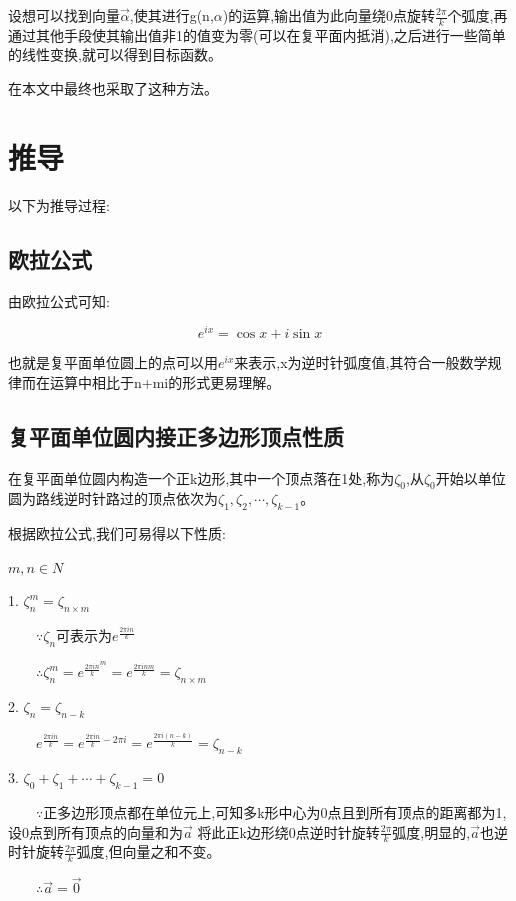 \documentclass[final,3p,times,onecolumn]{elsarticle}
\begin{document}
设想可以找到向量$\overrightarrow{\alpha}$,使其进行g(n,$\alpha$)的运算,输出值为此向量绕0点旋转$\frac{2\pi}{k}$个弧度,再通过其他手段使其输出值非1的值变为零(可以在复平面内抵消),之后进行一些简单的线性变换,就可以得到目标函数。

在本文中最终也采取了这种方法。

\section{推导}

以下为推导过程:

\subsection{欧拉公式}

由欧拉公式可知:

$$e^{ix}=\cos x+i\sin x$$

也就是复平面单位圆上的点可以用$e^{ix}$来表示,x为逆时针弧度值,其符合一般数学规律而在运算中相比于n+mi的形式更易理解。

\subsection{复平面单位圆内接正多边形顶点性质}

在复平面单位圆内构造一个正k边形,其中一个顶点落在1处,称为$\zeta_0$,从$\zeta_0$开始以单位圆为路线逆时针路过的顶点依次为$\zeta_1,\zeta_2,\cdots,\zeta_{k-1}$。

根据欧拉公式,我们可易得以下性质:

$m,n\in N$

1. $\zeta_n^m=\zeta_{n\times m}$

$\qquad\because\zeta_n$可表示为$e^{\frac{2\pi in}{k}}$

$\qquad\therefore\zeta_n^m=e^{\frac{2\pi in}{k}^m}=e^{\frac{2\pi inm}{k}}=\zeta_{n\times m}$

2. $\zeta_n=\zeta_{n-k}$

$\qquad e^{\frac{2\pi in}{k}}=e^{\frac{2\pi in}{k}-2\pi i}=e^{\frac{2\pi i(n-k)}{k}}=\zeta_{n-k}$

3. $\zeta_0+\zeta_1+\cdots+\zeta_{k-1}=0$

$\qquad\because$正多边形顶点都在单位元上,可知多k形中心为0点且到所有顶点的距离都为1,设0点到所有顶点的向量和为$\overrightarrow{a}$
将此正k边形绕0点逆时针旋转$\frac{2\pi}{k}$弧度,明显的,$\overrightarrow{a}$也逆时针旋转$\frac{2\pi}{k}$弧度,但向量之和不变。

$\qquad\therefore\overrightarrow{a}=\overrightarrow{0}$
\end{document}
